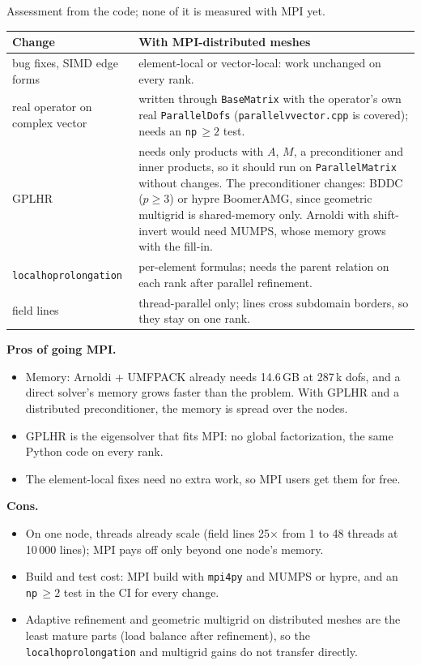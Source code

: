 \documentclass[10pt,a4paper]{article}
\newcommand{\sect}[1]{\par\vspace{5pt}{\large\bfseries\color{tu}#1}\par\vspace{1pt}}
\begin{document}
\sect{3\quad MPI: what carries over, pros and cons}
Assessment from the code; none of it is measured with MPI yet.
\begin{center}\small
\begin{tabularx}{\textwidth}{@{}l Y@{}}
\toprule
\textbf{Change} & \textbf{With MPI-distributed meshes}\\
\midrule
bug fixes, SIMD edge forms & element-local or vector-local: work unchanged on every rank.\\
real operator on complex vector & written through \texttt{BaseMatrix} with the operator's own real \texttt{ParallelDofs}
  (\texttt{parallelvvector.cpp} is covered); needs an \texttt{np}\,$\ge 2$ test.\\
GPLHR & needs only products with $A$, $M$, a preconditioner and inner products, so it should run on
  \texttt{ParallelMatrix} without changes. The preconditioner changes: BDDC ($p\ge3$) or hypre BoomerAMG, since geometric
  multigrid is shared-memory only. Arnoldi with shift-invert would need MUMPS, whose memory grows with the fill-in.\\
\texttt{localhoprolongation} & per-element formulas; needs the parent relation on each rank after parallel refinement.\\
field lines & thread-parallel only; lines cross subdomain borders, so they stay on one rank.\\
\bottomrule
\end{tabularx}
\end{center}
\vspace{-3pt}
\textbf{Pros of going MPI.}
\begin{itemize}
\item Memory: Arnoldi + UMFPACK already needs 14.6\,GB at 287\,k dofs, and a direct solver's memory grows faster
than the problem. With GPLHR and a distributed preconditioner, the memory is spread over the nodes.
\item GPLHR is the eigensolver that fits MPI: no global factorization, the same Python code on every rank.
\item The element-local fixes need no extra work, so MPI users get them for free.
\end{itemize}
\textbf{Cons.}
\begin{itemize}
\item On one node, threads already scale (field lines 25$\times$ from 1 to 48 threads at 10\,000 lines); MPI pays off only beyond one node's memory.
\item Build and test cost: MPI build with \texttt{mpi4py} and MUMPS or hypre, and an \texttt{np}\,$\ge2$ test in the CI for every change.
\item Adaptive refinement and geometric multigrid on distributed meshes are the least mature parts (load balance
  after refinement), so the \texttt{localhoprolongation} and multigrid gains do not transfer directly.
\end{itemize}
\end{document}
